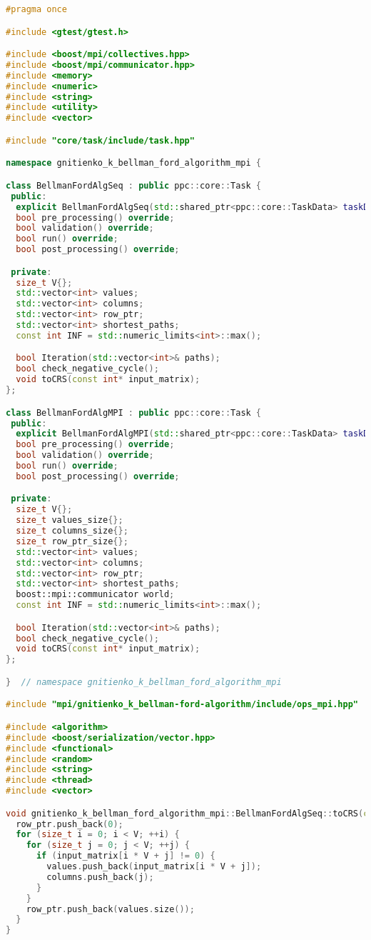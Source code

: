 \documentclass[12pt]{article}
\begin{document}
\begin{lstlisting}[language=C++, caption={Код алгоритма Беллмана-Форда}]
#pragma once

#include <gtest/gtest.h>

#include <boost/mpi/collectives.hpp>
#include <boost/mpi/communicator.hpp>
#include <memory>
#include <numeric>
#include <string>
#include <utility>
#include <vector>

#include "core/task/include/task.hpp"

namespace gnitienko_k_bellman_ford_algorithm_mpi {

class BellmanFordAlgSeq : public ppc::core::Task {
 public:
  explicit BellmanFordAlgSeq(std::shared_ptr<ppc::core::TaskData> taskData_) : Task(std::move(taskData_)) {}
  bool pre_processing() override;
  bool validation() override;
  bool run() override;
  bool post_processing() override;

 private:
  size_t V{};
  std::vector<int> values;
  std::vector<int> columns;
  std::vector<int> row_ptr;
  std::vector<int> shortest_paths;
  const int INF = std::numeric_limits<int>::max();

  bool Iteration(std::vector<int>& paths);
  bool check_negative_cycle();
  void toCRS(const int* input_matrix);
};

class BellmanFordAlgMPI : public ppc::core::Task {
 public:
  explicit BellmanFordAlgMPI(std::shared_ptr<ppc::core::TaskData> taskData_) : Task(std::move(taskData_)) {}
  bool pre_processing() override;
  bool validation() override;
  bool run() override;
  bool post_processing() override;

 private:
  size_t V{};
  size_t values_size{};
  size_t columns_size{};
  size_t row_ptr_size{};
  std::vector<int> values;
  std::vector<int> columns;
  std::vector<int> row_ptr;
  std::vector<int> shortest_paths;
  boost::mpi::communicator world;
  const int INF = std::numeric_limits<int>::max();

  bool Iteration(std::vector<int>& paths);
  bool check_negative_cycle();
  void toCRS(const int* input_matrix);
};

}  // namespace gnitienko_k_bellman_ford_algorithm_mpi

#include "mpi/gnitienko_k_bellman-ford-algorithm/include/ops_mpi.hpp"

#include <algorithm>
#include <boost/serialization/vector.hpp>
#include <functional>
#include <random>
#include <string>
#include <thread>
#include <vector>

void gnitienko_k_bellman_ford_algorithm_mpi::BellmanFordAlgSeq::toCRS(const int* input_matrix) {
  row_ptr.push_back(0);
  for (size_t i = 0; i < V; ++i) {
    for (size_t j = 0; j < V; ++j) {
      if (input_matrix[i * V + j] != 0) {
        values.push_back(input_matrix[i * V + j]);
        columns.push_back(j);
      }
    }
    row_ptr.push_back(values.size());
  }
}


\end{lstlisting}
\end{document}
